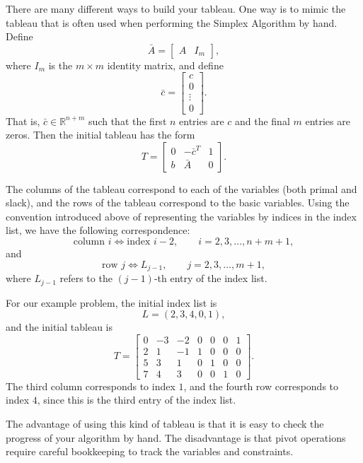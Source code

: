 There are many different ways to build your tableau.
One way is to mimic the tableau that is often used when performing the Simplex Algorithm by hand.
Define
\[
\bar{A} = \begin{bmatrix}
  A & I_m
\end{bmatrix},
\]
where $I_m$ is the $m \times m$ identity matrix,
and define
\[
\bar{c} = \begin{bmatrix}
  c\\
  0\\
  \vdots\\
  0
\end{bmatrix}.
\]
That is, $\bar{c} \in \mathbb{R}^{n+m}$ such that the first $n$ entries are $c$ and the final $m$ entries are zeros.
Then the initial tableau has the form
\begin{equation}
T = \begin{bmatrix}
    0 & -\bar{c}^T & 1  \\
    b & \bar{A} & 0
    \end{bmatrix}.
\label{eqn:hand_tab}
\end{equation}

The columns of the tableau correspond to each of the variables (both primal and slack), and the rows of the tableau
correspond to the basic variables. Using the convention introduced above
of representing the variables by indices in the index list, we have the following correspondence:
\[
\text{column } i \Leftrightarrow \text{index } i-2, \qquad i = 2, 3, \ldots, n+m+1,
\]
and
\[
\text{row } j \Leftrightarrow L_{j-1}, \qquad j = 2, 3, \ldots, m+1,
\]
where $L_{j-1}$ refers to the $(j-1)$-th entry of the index list.

For our example problem, the initial index list is
\[
L = (2, 3, 4, 0, 1),
\]
and the initial tableau is
\begin{equation*}
T = \begin{bmatrix}
    0 & -3 & -2 & 0 & 0 & 0 & 1\\
    2 & 1 & -1 & 1 & 0 & 0 & 0\\
    5 & 3 & 1 & 0 & 1 & 0 & 0\\
    7 & 4 & 3 & 0 & 0 & 1 & 0
    \end{bmatrix}.
\end{equation*}
The third column corresponds to index $1$, and the fourth row corresponds to index $4$, since this is the
third entry of the index list.

The advantage of using this kind of tableau is that it is easy to check the progress of your algorithm by hand.
The disadvantage is that pivot operations require careful bookkeeping to track the variables and constraints.

